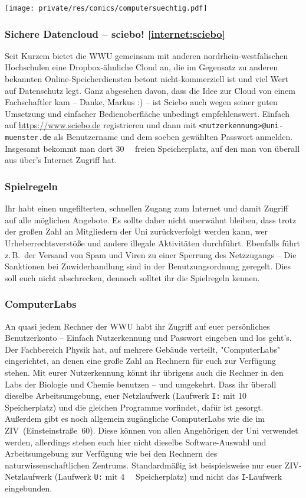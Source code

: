 \begin{multicols*}{2}
\begin{center}
	\texttt{[image: private/res/comics/computersuechtig.pdf]}
\end{center}

\subsubsection[Sichere Datencloud -- sciebo!]{Sichere Datencloud -- sciebo! \cref{internet:sciebo}}
Seit Kurzem bietet die WWU gemeinsam mit anderen nordrhein-westfälischen Hochschulen eine Dropbox-ähnliche Cloud an, die im Gegensatz zu anderen bekannten Online-Speicherdiensten betont nicht-kommerziell ist und viel Wert auf Datenschutz legt.
Ganz abgesehen davon, dass die Idee zur Cloud von einem Fachschaftler kam -- Danke, Markus :) -- ist Sciebo auch wegen seiner guten Umsetzung und einfacher Bedienoberfläche unbedingt empfehlenswert.
Einfach auf \url{https://www.sciebo.de} registrieren und dann mit \texttt{<nutzerkennung>@uni-muenster.de} als Benutzername und dem soeben gewählten Passwort anmelden.
Insgesamt bekommt man dort \SI{30}{\giga\byte} freien Speicherplatz, auf den man von überall aus über's Internet Zugriff hat.

\subsubsection{Spielregeln}
Ihr habt einen ungefilterten, schnellen Zugang zum Internet und damit Zugriff auf alle möglichen Angebote.
Es sollte daher nicht unerwähnt bleiben, dass trotz der großen Zahl an Mitgliedern der Uni zurückverfolgt werden kann, wer Urheberrechtsverstöße und andere illegale Aktivitäten durchführt.
Ebenfalls führt z.\,B.\ der Versand von Spam und Viren zu einer Sperrung des Netzzugangs -- Die Sanktionen bei Zuwiderhandlung sind in der Benutzungsordnung geregelt.
Dies soll euch nicht abschrecken, dennoch solltet ihr die Spielregeln kennen.

\subsubsection{ComputerLabs}
An quasi jedem Rechner der WWU habt ihr Zugriff auf euer persönliches Benutzerkonto -- Einfach Nutzerkennung und Passwort eingeben und los geht's.
Der Fachbereich Physik hat, auf mehrere Gebäude verteilt, "ComputerLabs" eingerichtet, an denen eine große Zahl an Rechnern für euch zur Verfügung stehen.
Mit eurer Nutzerkennung könnt ihr übrigens auch die Rechner in den Labs der Biologie und Chemie benutzen -- und umgekehrt.
Dass ihr überall dieselbe Arbeitsumgebung, euer Netzlaufwerk (Laufwerk \texttt{I:} mit \SI{10}{\giga\byte} Speicherplatz) und die gleichen Programme vorfindet, dafür ist gesorgt.
Außerdem gibt es noch allgemein zugängliche ComputerLabs wie die im ZIV~(Einsteinstraße~60).
Diese können von allen Angehörigen der Uni verwendet werden, allerdings stehen euch hier nicht dieselbe Software-Auswahl und Arbeitsumgebung zur Verfügung wie bei den Rechnern des naturwissenschaftlichen Zentrums.
Standardmäßig ist beispielsweise nur euer ZIV-Netzlaufwerk (Laufwerk \texttt{U:} mit \SI{4}{\giga\byte} Speicherplatz) und nicht das \texttt{I}-Laufwerk eingebunden.


\end{multicols*}
